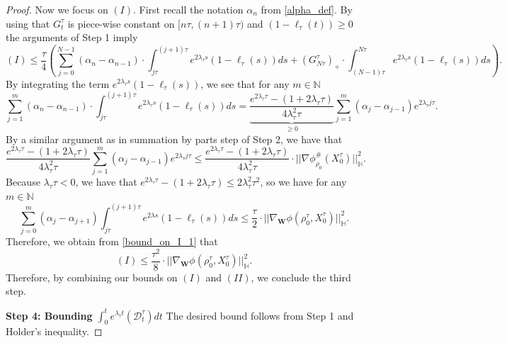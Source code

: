 \documentclass[10pt,a4paper]{amsart}
\newcommand{\N}{\mathbb{N}}
\begin{document}
\begin{proof}
Now we focus on $(I)$. First recall the notation $\alpha_n$ from \eqref{alpha_def}. By using that $G^{\tau}_{t}$ is piece-wise constant on $[n\tau,(n+1)\tau)$ and $(1-\ell_{\tau}(t)) \geq 0$ the arguments of Step 1 imply
\begin{equation}
(I) \leq \frac{\tau}{4} \left( \sum_{j=0}^{N-1} (\alpha_n-\alpha_{n-1}) \cdot \int_{j \tau}^{(j+1)\tau}  e^{2 \lambda_{\tau} s} (1-\ell_{\tau}(s)) ds + (G^{\tau}_{N \tau})_{+} \cdot \int_{(N-1)\tau}^{N \tau} e^{2 \lambda_{\tau} s} (1-\ell_{\tau}(s)) ds    \right). \label{bound_on_I_1}
\end{equation} By integrating the term $e^{2 \lambda_{\tau} s} (1-\ell_{\tau}(s))$, we see that for any $m \in \N$
\[ \sum_{j=1}^{m} (\alpha_n-\alpha_{n-1}) \cdot \int_{j \tau}^{(j+1)\tau}  e^{2 \lambda_{\tau} s} (1-\ell_{\tau}(s)) ds = 
\underbrace{\frac{ e^{2 \lambda_{\tau} \tau} - (1+2\lambda_{\tau} \tau)  }{4 \lambda_{\tau}^2 \tau}}_{\geq 0} \sum_{j=1}^{m} (\alpha_j-\alpha_{j-1}) e^{2 \lambda_{\tau} j \tau}.  \] By a similar argument as in summation by parts step of Step 2, we have that
\[ \frac{ e^{2 \lambda_{\tau} \tau} - (1+2\lambda_{\tau} \tau)  }{4 \lambda_{\tau}^2 \tau} \sum_{j=1}^{m} (\alpha_j-\alpha_{j-1}) e^{2 \lambda_{\tau} j \tau} \leq \frac{ e^{2 \lambda_{\tau} \tau} - (1+2\lambda_{\tau} \tau)  }{4 \lambda_{\tau}^2 \tau}  \cdot ||\nabla \phi^{\#}_{\rho_0}(X_0^{\tau})||^2_{\mathbb{H}}.  \]
Because $\lambda_{\tau} \tau < 0$, we have that $e^{2\lambda_{\tau} \tau} - (1+2\lambda_{\tau}  \tau) \leq 2\lambda_{\tau}^2 \tau^2$, so we have for any $m \in \N$
\[
\sum_{j=0}^{m} (\alpha_j-\alpha_{j+1}) \int_{j \tau}^{(j+1)\tau} e^{2 \lambda s} (1-\ell_{\tau}(s)) ds \leq \frac{\tau}{2} \cdot ||\nabla_{\mathbf{W}} \phi(\rho^{\tau}_0,X^{\tau}_0)||^2_{\mathbb{H}}.
\]  Therefore, we obtain from \eqref{bound_on_I_1} that
\[ (I) \leq \frac{\tau^2}{8} \cdot ||\nabla_{\mathbf{W}} \phi(\rho^{\tau}_0,X^{\tau}_0)||^2_{\mathbb{H}} .  \] Therefore, by combining our bounds on $(I)$ and $(II)$, we conclude the third step. \smallskip

\noindent \textbf{Step 4: Bounding $\int_0^t e^{\lambda_{\tau} t} (\mathcal{D}_t^{\tau}) dt$}
The desired bound follows from Step 1 and Holder's inequality.\end{proof}
\end{document}
